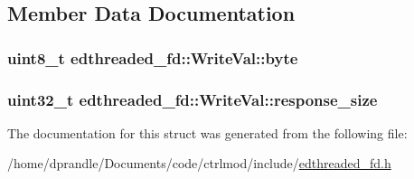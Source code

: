 \subsection{Member Data Documentation}
\hypertarget{structedthreaded__fd_1_1WriteVal_abddfddda0a4db161d604a6d928fc275e}{
\subsubsection[{byte}]{\setlength{\rightskip}{0pt plus 5cm}uint8\-\_\-t edthreaded\-\_\-fd\-::\-Write\-Val\-::byte}}\label{structedthreaded__fd_1_1WriteVal_abddfddda0a4db161d604a6d928fc275e}
\hypertarget{structedthreaded__fd_1_1WriteVal_abc008bb97658cfd09ed941c266b1168d}{
\subsubsection[{response\-\_\-size}]{\setlength{\rightskip}{0pt plus 5cm}uint32\-\_\-t edthreaded\-\_\-fd\-::\-Write\-Val\-::response\-\_\-size}}\label{structedthreaded__fd_1_1WriteVal_abc008bb97658cfd09ed941c266b1168d}


The documentation for this struct was generated from the following file\-:\begin{DoxyCompactItemize}
\item 
/home/dprandle/\-Documents/code/ctrlmod/include/\hyperlink{edthreaded__fd_8h}{edthreaded\-\_\-fd.\-h}\end{DoxyCompactItemize}
